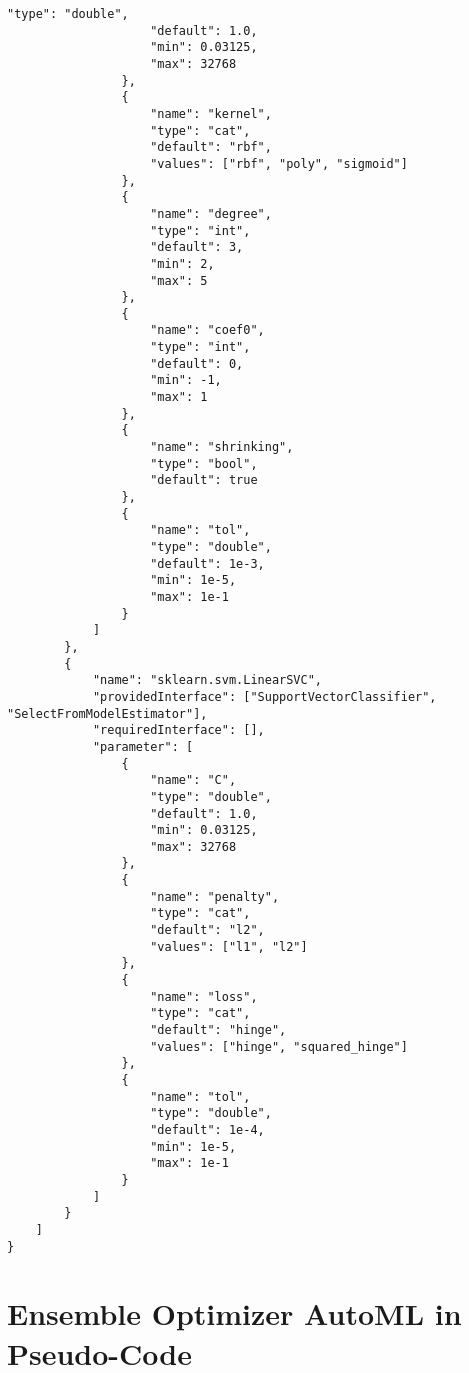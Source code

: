 \begin{Verbatim}[fontsize=\scriptsize]
                    "type": "double",
                    "default": 1.0,
                    "min": 0.03125,
                    "max": 32768
                },
                {
                    "name": "kernel",
                    "type": "cat",
                    "default": "rbf",
                    "values": ["rbf", "poly", "sigmoid"]
                },
                {
                    "name": "degree",
                    "type": "int",
                    "default": 3,
                    "min": 2,
                    "max": 5
                },
                {
                    "name": "coef0",
                    "type": "int",
                    "default": 0,
                    "min": -1,
                    "max": 1
                },
                {
                    "name": "shrinking",
                    "type": "bool",
                    "default": true
                },
                {
                    "name": "tol",
                    "type": "double",
                    "default": 1e-3,
                    "min": 1e-5,
                    "max": 1e-1
                }
            ]
        },
        {
            "name": "sklearn.svm.LinearSVC",
            "providedInterface": ["SupportVectorClassifier", "SelectFromModelEstimator"],
            "requiredInterface": [],
            "parameter": [
                {
                    "name": "C",
                    "type": "double",
                    "default": 1.0,
                    "min": 0.03125,
                    "max": 32768
                },
                {
                    "name": "penalty",
                    "type": "cat",
                    "default": "l2",
                    "values": ["l1", "l2"]
                },
                {
                    "name": "loss",
                    "type": "cat",
                    "default": "hinge",
                    "values": ["hinge", "squared_hinge"]
                },
                {
                    "name": "tol",
                    "type": "double",
                    "default": 1e-4,
                    "min": 1e-5,
                    "max": 1e-1
                }
            ]
        }
    ]
}
\end{Verbatim}

\section{Ensemble Optimizer AutoML in Pseudo-Code}
\label{sec:appendix:pseudo-code}

